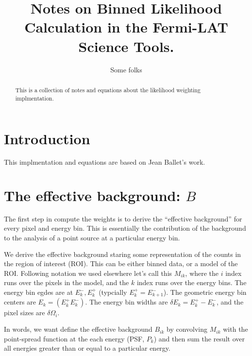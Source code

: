 \documentclass[preprint]{aastex}
\begin{document}
%
\title{Notes on Binned Likelihood Calculation in the Fermi-LAT Science Tools.}  

\author{ 
Some folks
}



\begin{abstract}
  This is a collection of notes and equations about the likelihood weighting implmentation.
\end{abstract}

\maketitle

\section{Introduction}

This implmentation and equations are based on Jean Ballet's work.


\section{The effective background: $B$}

The first step in compute the weights is to derive the ``effective
background'' for every pixel and energy bin.  This is essentially the
contribution of the background to the analysis of a point source at a
particular energy bin.

We derive the effective background staring some representation of the
counts in the region of interest (ROI).  This can be either binned
data, or a model of the ROI.  Following notation we used elsewhere
let's call this $M_{ik}$, where the $i$ index runs over the pixels in
the model, and the $k$ index runs over the energy bins.  The energy
bin egdes are at $E_k^-, E_k^+$ (typcially $E_k^+ = E_{k+1}^-$).  The
geometric energy bin centers are $E_k = (E_k^+ E_k^-)$.  The energy
bin widths are $\delta E_k = E_k^+ - E_k^-$, and the pixel sizes are
$\delta \Omega_i$.

In words, we want define the effective background $B_{ik}$ by
convolving $M_{ik}$ with the point-spread function at the each energy (PSF, $P_k$) and then
sum the result over all energies greater than or equal to a particular
energy.
\end{document}
